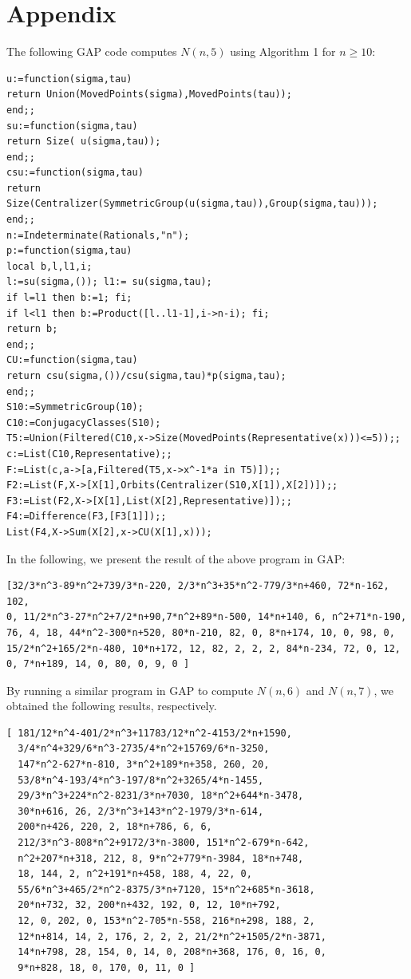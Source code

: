 \documentclass{amsart}
\numberwithin{equation}{section}
\begin{document}
\section{Appendix}\label{appen}
The following \textsf{GAP} \cite{GAP} code computes $N(n,5)$ using Algorithm 1 for $n \geq 10$:
{\scriptsize
\begin{verbatim}
u:=function(sigma,tau) 
return Union(MovedPoints(sigma),MovedPoints(tau));
end;;
su:=function(sigma,tau) 
return Size( u(sigma,tau));
end;;
csu:=function(sigma,tau)
return Size(Centralizer(SymmetricGroup(u(sigma,tau)),Group(sigma,tau)));
end;;
n:=Indeterminate(Rationals,"n");
p:=function(sigma,tau) 
local b,l,l1,i; 
l:=su(sigma,()); l1:= su(sigma,tau); 
if l=l1 then b:=1; fi; 
if l<l1 then b:=Product([l..l1-1],i->n-i); fi; 
return b; 
end;;
CU:=function(sigma,tau) 
return csu(sigma,())/csu(sigma,tau)*p(sigma,tau);
end;;
S10:=SymmetricGroup(10);
C10:=ConjugacyClasses(S10);
T5:=Union(Filtered(C10,x->Size(MovedPoints(Representative(x)))<=5));;
c:=List(C10,Representative);;
F:=List(c,a->[a,Filtered(T5,x->x^-1*a in T5)]);;
F2:=List(F,X->[X[1],Orbits(Centralizer(S10,X[1]),X[2])]);;
F3:=List(F2,X->[X[1],List(X[2],Representative)]);;
F4:=Difference(F3,[F3[1]]);;
List(F4,X->Sum(X[2],x->CU(X[1],x)));
\end{verbatim}}
In the following, we present the result of the above program in \textsf{GAP}:
\begin{lstlisting}
[32/3*n^3-89*n^2+739/3*n-220, 2/3*n^3+35*n^2-779/3*n+460, 72*n-162, 102,
0, 11/2*n^3-27*n^2+7/2*n+90,7*n^2+89*n-500, 14*n+140, 6, n^2+71*n-190, 
76, 4, 18, 44*n^2-300*n+520, 80*n-210, 82, 0, 8*n+174, 10, 0, 98, 0, 
15/2*n^2+165/2*n-480, 10*n+172, 12, 82, 2, 2, 2, 84*n-234, 72, 0, 12,
0, 7*n+189, 14, 0, 80, 0, 9, 0 ]
\end{lstlisting}
By running a similar program in \textsf{GAP} to compute $N(n,6)$ and $N(n,7)$, we obtained the following results, respectively.
\begin{lstlisting}
[ 181/12*n^4-401/2*n^3+11783/12*n^2-4153/2*n+1590, 
  3/4*n^4+329/6*n^3-2735/4*n^2+15769/6*n-3250, 
  147*n^2-627*n-810, 3*n^2+189*n+358, 260, 20, 
  53/8*n^4-193/4*n^3-197/8*n^2+3265/4*n-1455, 
  29/3*n^3+224*n^2-8231/3*n+7030, 18*n^2+644*n-3478, 
  30*n+616, 26, 2/3*n^3+143*n^2-1979/3*n-614, 
  200*n+426, 220, 2, 18*n+786, 6, 6, 
  212/3*n^3-808*n^2+9172/3*n-3800, 151*n^2-679*n-642, 
  n^2+207*n+318, 212, 8, 9*n^2+779*n-3984, 18*n+748, 
  18, 144, 2, n^2+191*n+458, 188, 4, 22, 0, 
  55/6*n^3+465/2*n^2-8375/3*n+7120, 15*n^2+685*n-3618, 
  20*n+732, 32, 200*n+432, 192, 0, 12, 10*n+792, 
  12, 0, 202, 0, 153*n^2-705*n-558, 216*n+298, 188, 2, 
  12*n+814, 14, 2, 176, 2, 2, 2, 21/2*n^2+1505/2*n-3871, 
  14*n+798, 28, 154, 0, 14, 0, 208*n+368, 176, 0, 16, 0, 
  9*n+828, 18, 0, 170, 0, 11, 0 ]
\end{lstlisting}
\end{document}
